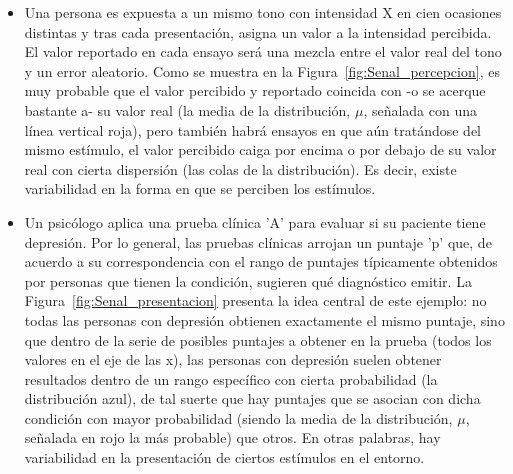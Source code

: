 \begin{itemize}
\item Una persona es expuesta a un mismo tono con intensidad X en cien ocasiones distintas y tras cada presentación, asigna un valor a la intensidad percibida. El valor reportado en cada ensayo será una mezcla entre el valor real del tono y un error aleatorio. Como se muestra en la Figura~\ref{fig:Senal_percepcion}, es muy probable que el valor percibido y reportado coincida con -o se acerque bastante a- su valor real (la media de la distribución, $\mu$, señalada con una línea vertical roja), pero también habrá ensayos en que aún tratándose del mismo estímulo, el valor percibido caiga por encima o por debajo de su valor real con cierta dispersión (las colas de la distribución). Es decir, existe variabilidad en la forma en que se perciben los estímulos.\\

\item Un psicólogo aplica una prueba clínica 'A' para evaluar si su paciente tiene depresión. Por lo general, las pruebas clínicas arrojan un puntaje 'p' que, de acuerdo a su correspondencia con el rango de puntajes típicamente obtenidos por personas que tienen la condición, sugieren qué diagnóstico emitir. La Figura~\ref{fig:Senal_presentacion} presenta la idea central de este ejemplo: no todas las personas con depresión obtienen exactamente el mismo puntaje, sino que dentro de la serie de posibles puntajes a obtener en la prueba (todos los valores en el eje de las x), las personas con depresión suelen obtener resultados dentro de un rango específico con cierta probabilidad (la distribución azul), de tal suerte que hay puntajes que se asocian con dicha condición con mayor probabilidad (siendo la media de la distribución, $\mu$, señalada en rojo la más probable) que otros. En otras palabras, hay variabilidad en la presentación de ciertos estímulos en el entorno.\\
\end{itemize}

